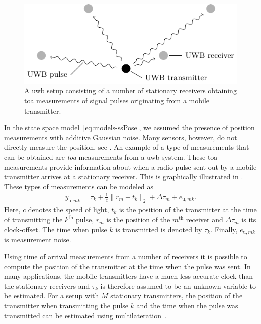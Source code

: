 \begin{figure}
	\centering
		\includegraphics[scale = 1]{figure6_1.pdf}
  \caption{A \gls{uwb} setup consisting of a number of
    		stationary receivers obtaining \acrlong{toa} measurements of
    		signal pulses originating from a mobile transmitter.}
  \label{fig:appl-uwb-uwbSetup}
\end{figure}

In the state space model~\eqref{eq:models-ssPose}, we assumed the presence of position measurements with additive Gaussian noise. Many sensors, however, do not directly measure the position, see \eg \cite{gustafssonG:2005}. An example of a type of measurements that can be obtained are \emph{\gls{toa}} measurements from a \gls{uwb} system. These \gls{toa} measurements provide information about when a radio pulse sent out by a mobile transmitter arrives at a stationary receiver. This is graphically illustrated in . These types of measurements can be modeled as
\begin{align}
  \label{eq:appl-uwb-measModel}
  y_{\text{u},mk} = \tau_{k}
    + \tfrac{1}{c} \| r_m - t_{k} \|_2 
    + \Delta\tau_m
    +   e_{\text{u},mk}.
\end{align}
Here, $c$ denotes the speed of light, $t_{k}$
is the position of the transmitter at the time of transmitting the $k^\text{th}$ pulse,
$r_m$ is the position of the $m^\text{th}$ receiver and $\Delta\tau_m$ is its clock-offset. The time when pulse $k$ is transmitted is denoted by $\tau_{k}$. Finally, $e_{\text{u},mk}$ is measurement noise. 

Using time of arrival measurements from a number of receivers it is possible to compute the position of the transmitter at the time when the pulse was sent. In many applications, the mobile transmitters have a much less accurate clock than the stationary receivers and $\tau_{k}$ is therefore assumed to be an unknown variable to be estimated. For a setup with $M$ stationary transmitters, the position of the transmitter when transmitting the pulse $k$ and the time when the pulse was transmitted can be estimated using multilateration~\citep{chanH:1994, geziciTGKMPS:2005,sayedTK:2005, sahinogluGG:2008}. 

